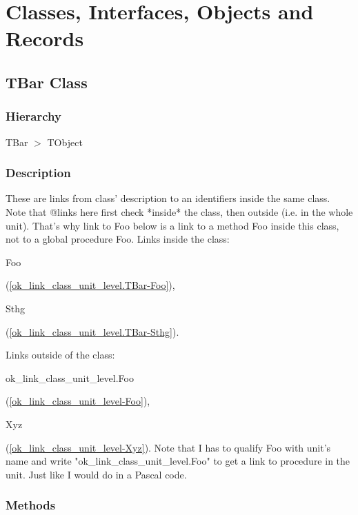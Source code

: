 \documentclass{report}
\newif\ifpdf
\begin{document}
\section{Classes, Interfaces, Objects and Records}
\ifpdf
\subsection*{\large{\textbf{TBar Class}}\normalsize\hspace{1ex}\hrulefill}
\else
\subsection*{TBar Class}
\fi
\label{ok_link_class_unit_level.TBar}
\subsubsection*{\large{\textbf{Hierarchy}}\normalsize\hspace{1ex}\hfill}
TBar {$>$} TObject
\subsubsection*{\large{\textbf{Description}}\normalsize\hspace{1ex}\hfill}
These are links from class' description to an identifiers inside the same class. Note that @links here first check *inside* the class, then outside (i.e. in the whole unit). That's why link to Foo below is a link to a method Foo inside this class, not to a global procedure Foo. Links inside the class: \begin{ttfamily}Foo\end{ttfamily}(\ref{ok_link_class_unit_level.TBar-Foo}), \begin{ttfamily}Sthg\end{ttfamily}(\ref{ok_link_class_unit_level.TBar-Sthg}).

Links outside of the class: \begin{ttfamily}ok{\_}link{\_}class{\_}unit{\_}level.Foo\end{ttfamily}(\ref{ok_link_class_unit_level-Foo}), \begin{ttfamily}Xyz\end{ttfamily}(\ref{ok_link_class_unit_level-Xyz}). Note that I has to qualify Foo with unit's name and write "ok{\_}link{\_}class{\_}unit{\_}level.Foo" to get a link to procedure in the unit. Just like I would do in a Pascal code.\subsubsection*{\large{\textbf{Methods}}\normalsize\hspace{1ex}\hfill}
\end{document}
